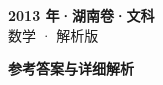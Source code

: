 \documentclass[zihao=-4, a4paper]{ctexart}
\begin{document}
\begin{center}
  {\Large\bfseries 2013 年·湖南卷·文科}\\[4pt]
  {\large 数学 · 解析版}
\end{center}
\medskip
{}

\clearpage
{}
\begin{center}{\Large\bfseries 参考答案与详细解析}\end{center}
\medskip

\end{document}
